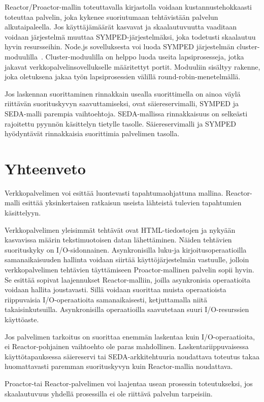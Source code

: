 \documentclass[finnish]{tktltiki2}
\theoremstyle{definition}
\theoremstyle{remark}
\begin{document}
Reactor/Proactor-mallin toteuttavalla
kirjastolla voidaan kustannustehokkaasti
toteuttaa palvelin, joka kykenee suoriutumaan
tehtävistään palvelun alkutaipaleella. Jos
käyttäjämäärät kasvavat ja skaalautuvuutta
vaaditaan voidaan järjestelmä muuttaa SYMPED-järjestelmäksi,
joka todetusti skaalautuu hyvin resursseihin.
Node.js sovelluksesta voi luoda SYMPED järjestelmän
cluster-moduulilla~\cite{noauthor_cluster_nodate}.
Cluster-moduulilla on helppo luoda useita lapsiprosesseja,
jotka jakavat verkkopalvelinsovellukselle määritettyt
portit. Moduuliin sisältyy rakenne,
joka oletuksena jakaa työn lapsiprosessien välillä
round-robin-menetelmällä.

Jos laskennan suorittaminen rinnakkain usealla suorittimella
on ainoa väylä riittävän suorituskyvyn saavuttamiseksi,
ovat säiereservimalli, SYMPED ja SEDA-malli parempia vaihtoehtoja.
SEDA-mallissa rinnakkaisuus on selkeästi rajoitettu
pyynnön käsittelyn tietylle tasolle. Säiereservimalli ja SYMPED
hyödyntävät rinnakkaisia suorittimia palvelimen tasolla.

\section{Yhteenveto}\label{sec:yhteenveto}

Verkkopalvelimen voi esittää luontevasti
tapahtumaohjattuna mallina. Reactor-malli esittää yksinkertaisen
ratkaisun useista lähteistä tulevien tapahtumien käsittelyyn.

Verkkopalvelimen yleisimmät tehtävät ovat
HTML-tiedostojen ja nykyään kasvavissa määrin
tekstimuotoisen datan lähettäminen.
Näiden tehtävien suorituskyky on
I/O-sidonnainen.
Asynkronisilla luku-ja kirjoitusoperaatioilla samanaikaisuuden hallinta
voidaan siirtää käyttöjärjestelmän vastuulle, jolloin
verkkopalvelimen tehtävien täyttämiseen Proactor-mallinen
palvelin sopii hyvin.
Se esittää sopivat laajennukset Reactor-malliin, joilla
asynkronisia operaatioita voidaan hallita joustavasti.
Sillä voidaan suorittaa muista operaatioista riippuvaisia I/O-operaatioita
samanaikaisesti, ketjuttamalla niitä takaisinkutsuilla.
Asynkronisilla operaatioilla saavutetaan suuri I/O-resurssien
käyttöaste.

Jos palvelimen tarkoitus on suorittaa enemmän laskentaa kuin
I/O-operaatioita, ei Reactor-pohjainen vaihtoehto ole paras mahdollinen.
Laskentariippuvaisessa käyttötapauksessa säiereservi tai SEDA-arkkitehtuuria
noudattava toteutus takaa huomattavasti paremman suorituskyvyn kuin
Reactor-mallia noudattava.

Proactor-tai Reactor-palvelimen voi laajentaa
usean prosessin toteutukseksi, jos skaalautuvuus
yhdellä prosessilla ei ole riittävä palvelun tarpeisiin.




\end{document}
